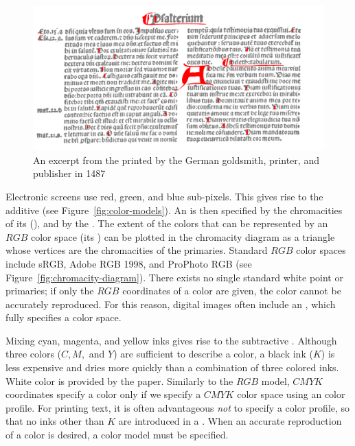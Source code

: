 \begin{figure}[b!]
  \includegraphics[width=\textwidth]{examples/03/1500-latin-vulgate}
  \caption{An excerpt from the  printed by
    the German goldsmith, printer, and publisher  in
    1487}
  \label{fig:vulgate-bible}
\end{figure}

Electronic screens use red, green, and blue sub-pixels. This gives rise to the
additive 
(see Figure~\ref{fig:color-models}). An  is then specified by the chromacities of its
 (), and by the . The extent of the colors that can be represented by an $RGB$ color
space (its ) can be plotted in the chromacity diagram as a triangle
whose vertices are the chromacities of the primaries. Standard $RGB$ color
spaces include sRGB, Adobe RGB 1998, and ProPhoto RGB (see
Figure~\ref{fig:chromacity-diagram}).
There exists no single standard white point or primaries; if only the $RGB$
coordinates of a color are given, the color cannot be accurately reproduced.
For this reason, digital images often include an  , which fully specifies a color space.

Mixing cyan, magenta, and yellow inks gives rise to the subtractive
. Although three colors ($C,
M,$ and $Y$) are sufficient to describe a color, a black ink ($K$) is less
expensive and dries more quickly than a combination of three colored inks.
White color is provided by the paper. Similarly to the $RGB$ model, $CMYK$
coordinates specify a color only if we specify a $CMYK$ color space using an  color profile. For printing text, it is
often advantageous \emph{not} to specify a color profile, so that no inks other
than $K$ are introduced in a . When an accurate
reproduction of a color is desired, a color model must be specified.

